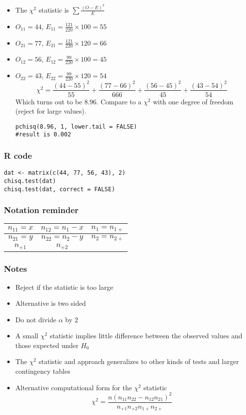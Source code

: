 \documentclass[aspectratio=169]{beamer}
\begin{document}
\begin{frame}[fragile]
\begin{itemize}
\item The $\chi^2$ statistic is $\sum \frac{(O - E)^2}{E}$
\item $O_{11} = 44$, $E_{11} = \frac{121}{220}\times 100 = 55$
\item $O_{21} = 77$, $E_{21} = \frac{121}{220}\times 120 = 66$
\item $O_{12} = 56$, $E_{12} = \frac{99}{220}\times 100 = 45$
\item $O_{22} = 43$, $E_{22} = \frac{99}{220}\times 120 = 54$
$$
\chi^2  = \frac{(44 - 55)^2}{55} + \frac{(77 - 66)^2}{666} 
         + \frac{(56 - 45)^2}{45} + \frac{(43 - 54)^2}{54} 
$$
Which turns out to be $8.96$. Compare to a $\chi^2$ with one degree of
freedom (reject for large values).
\begin{verbatim}
pchisq(8.96, 1, lower.tail = FALSE) 
#result is 0.002
\end{verbatim}
\end{itemize}
\end{frame}

\begin{frame}[fragile]\frametitle{R code}
\begin{verbatim}
dat <- matrix(c(44, 77, 56, 43), 2)
chisq.test(dat)
chisq.test(dat, correct = FALSE)
\end{verbatim}  
\end{frame}

\begin{frame}\frametitle{Notation reminder}
\begin{center}
\begin{tabular}{|c|c|c|}\hline
$n_{11} = x$ & $n_{12} = n_1 - x$ & $n_1 = n_{1+}$ \\ \hline
$n_{21} = y$ & $n_{22} = n_2 - y$ & $n_2 = n_{2+}$ \\ \hline
$n_{+1}$     & $n_{+2}$           &       \\ \hline 
\end{tabular}
\end{center}
\end{frame}

\begin{frame}\frametitle{Notes}
\begin{itemize}
\item Reject if the statistic is too large
\item Alternative is two sided
\item Do not divide $\alpha$ by $2$
\item A small $\chi^2$ statistic implies little difference between the
  observed values and those expected under $H_0$
\item The $\chi^2$ statistic and approach generalizes to other kinds of
  tests and larger contingency tables
\item Alternative computational form for the $\chi^2$ statistic
$$
\chi^2 = \frac{n(n_{11} n_{22} - n_{12}n_{21})^2}{n_{+1} n_{+2} n_{1+} n_{2+}}
$$
\end{itemize}
\end{frame} 
\end{document}
